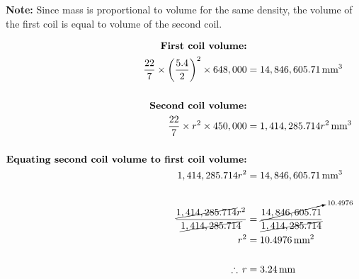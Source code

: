 \documentclass[
  a4paperpaper,
]{scrbook}
\begin{document}
\begin{tcolorbox}[enhanced jigsaw, left=2mm, colframe=quarto-callout-caution-color-frame, toptitle=1mm, opacitybacktitle=0.6, rightrule=.15mm, colbacktitle=quarto-callout-caution-color!10!white, colback=white, arc=.35mm, breakable, leftrule=.75mm, bottomtitle=1mm, bottomrule=.15mm, title=\textcolor{quarto-callout-caution-color}{\faFire}\hspace{0.5em}{Solution}, titlerule=0mm, coltitle=black, toprule=.15mm, opacityback=0]

\textbf{Note:} Since mass is proportional to volume for the same
density, the volume of the first coil is equal to volume of the second
coil.

\[
\begin{aligned}
\textbf{First coil volume:} \\
\frac{22}{7} \times \left(\frac{5.4}{2}\right)^2 \times 648,000 &= 14,846,605.71 \, \text{mm}^3 \\
\\
\textbf{Second coil volume:} \\
\frac{22}{7} \times r^2 \times 450,000 &= 1,414,285.714r^2 \, \text{mm}^3 \\
\\
\textbf{Equating second coil volume to first coil volume:} \\
1,414,285.714r^2 &= 14,846,605.71 \, \text{mm}^3 \\
\\
\frac{\cancel{1,414,285.714}r^2}{\cancel{1,414,285.714}} &= \frac{\cancelto{10.4976}{14,846,605.71}}{\cancel{1,414,285.714}} \\
r^2 &= 10.4976 \, \text{mm}^2 \\
\\
\therefore \, r &= 3.24 \, \text{mm}
\end{aligned}
\]

\end{tcolorbox}
\end{document}
